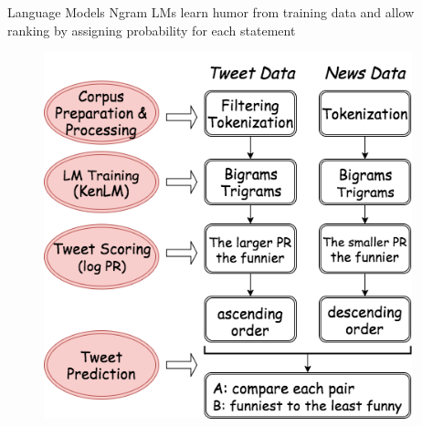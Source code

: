 \documentclass[final]{beamer}
\newlength{\sepwid}
\newlength{\onecolwid}
\newlength{\twocolwid}
\begin{document}
\begin{frame}[t]
\begin{columns}[t]
\begin{column}{\sepwid}\end{column} %

\begin{column}{\onecolwid} %






\begin{block}{Language Models}
Ngram LMs learn humor from training data and allow ranking by assigning probability for each statement \cite{Heafield-estimate}\cite{hello}
\begin{figure}
\includegraphics[width=0.77\linewidth]{Method.png} 
\end{figure}
\end{block}


\end{column}
\end{columns}
\end{frame}
\end{document}
